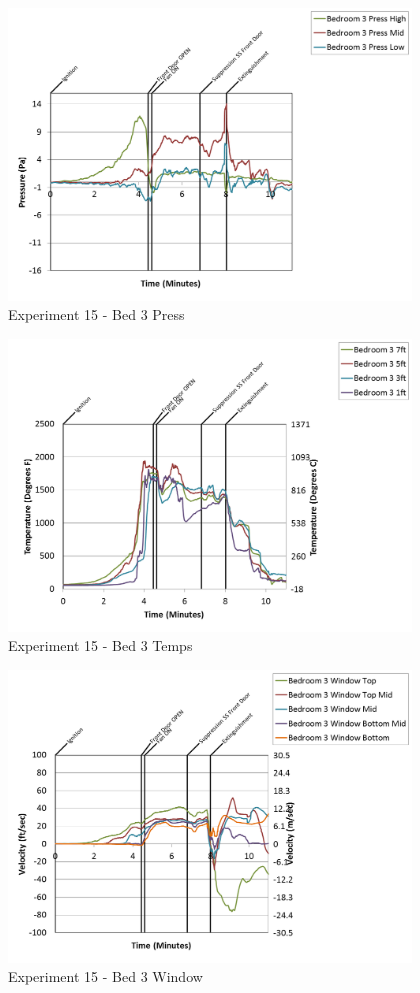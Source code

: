 \documentclass{article}
\begin{document}
\begin{appendices}
\begin{figure}[h!]
	\centering
	\includegraphics[height=3.05in]{0_Images/Results_Charts/Exp_15_Charts/Bed3Press.png}
	\caption{Experiment 15 - Bed 3 Press}
\end{figure}

\clearpage

\begin{figure}[h!]
	\centering
	\includegraphics[height=3.05in]{0_Images/Results_Charts/Exp_15_Charts/Bed3Temps.png}
	\caption{Experiment 15 - Bed 3 Temps}
\end{figure}


\begin{figure}[h!]
	\centering
	\includegraphics[height=3.05in]{0_Images/Results_Charts/Exp_15_Charts/Bed3Window.png}
	\caption{Experiment 15 - Bed 3 Window}
\end{figure}


\end{appendices}
\end{document}
